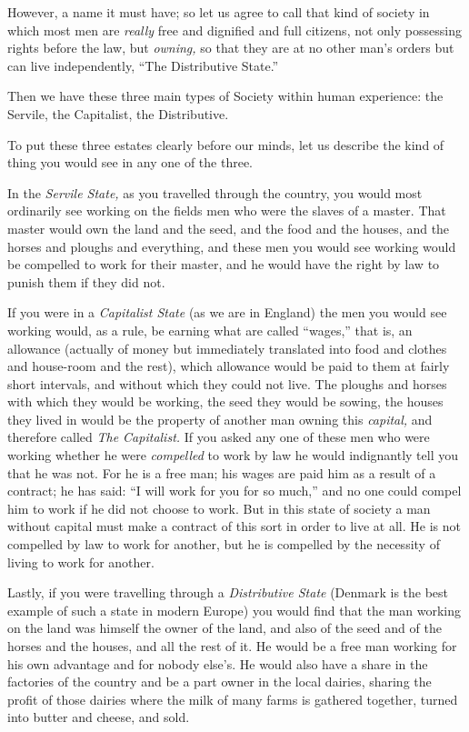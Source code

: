 \documentclass{book}
\begin{document}
However, a name it must have; so let us agree to call that kind of society in which most men are \emph{really} free and dignified and full citizens, not only possessing rights before the law, but \emph{owning,} so that they are at no other man’s orders but can live independently, “The Distributive State.”

Then we have these three main types of Society within human experience: the Servile, the Capitalist, the Distributive.

To put these three estates clearly before our minds, let us describe the kind of thing you would see in any one of the three.

In the \emph{Servile State,} as you travelled through the country, you would most ordinarily see working on the fields men who were the slaves of a master. That master would own the land and the seed, and the food and the houses, and the horses and ploughs and everything, and these men you would see working would be compelled to work for their master, and he would have the right by law to punish them if they did not.

If you were in a \emph{Capitalist State} (as we are in England) the men you would see working would, as a rule, be earning what are called “wages,” that is, an allowance (actually of money but immediately translated into food and clothes and house-room and the rest), which allowance would be paid to them at fairly short intervals, and without which they could not live. The ploughs and horses with which they would be working, the seed they would be sowing, the houses they lived in would be the property of another man owning this \emph{capital,} and therefore called \emph{The Capitalist.} If you asked any one of these men who were working whether he were \emph{compelled} to work by law he would indignantly tell you that he was not. For he is a free man; his wages are paid him as a result of a contract; he has said: “I will work for you for so much,” and no one could compel him to work if he did not choose to work. But in this state of society a man without capital must make a contract of this sort in order to live at all. He is not compelled by law to work for another, but he is compelled by the necessity of living to work for another.

Lastly, if you were travelling through a \emph{Distributive State} (Denmark is the best example of such a state in modern Europe) you would find that the man working on the land was himself the owner of the land, and also of the seed and of the horses and the houses, and all the rest of it. He would be a free man working for his own advantage and for nobody else’s. He would also have a share in the factories of the country and be a part owner in the local dairies, sharing the profit of those dairies where the milk of many farms is gathered together, turned into butter and cheese, and sold.
\end{document}

